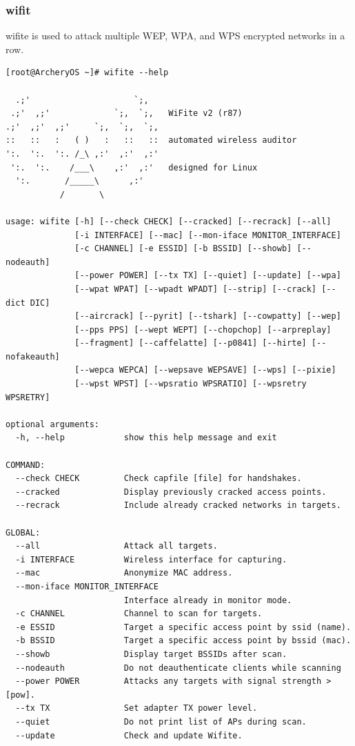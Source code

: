 \documentclass{article}
\begin{document}
\subsubsection{wifit}
wifite is used to attack multiple WEP, WPA, and WPS encrypted networks in a row.
\begin{lstlisting}
[root@ArcheryOS ~]# wifite --help

  .;'                     `;,    
 .;'  ,;'             `;,  `;,   WiFite v2 (r87)
.;'  ,;'  ,;'     `;,  `;,  `;,  
::   ::   :   ( )   :   ::   ::  automated wireless auditor
':.  ':.  ':. /_\ ,:'  ,:'  ,:'  
 ':.  ':.    /___\    ,:'  ,:'   designed for Linux
  ':.       /_____\      ,:'     
           /       \             

usage: wifite [-h] [--check CHECK] [--cracked] [--recrack] [--all]
              [-i INTERFACE] [--mac] [--mon-iface MONITOR_INTERFACE]
              [-c CHANNEL] [-e ESSID] [-b BSSID] [--showb] [--nodeauth]
              [--power POWER] [--tx TX] [--quiet] [--update] [--wpa]
              [--wpat WPAT] [--wpadt WPADT] [--strip] [--crack] [--dict DIC]
              [--aircrack] [--pyrit] [--tshark] [--cowpatty] [--wep]
              [--pps PPS] [--wept WEPT] [--chopchop] [--arpreplay]
              [--fragment] [--caffelatte] [--p0841] [--hirte] [--nofakeauth]
              [--wepca WEPCA] [--wepsave WEPSAVE] [--wps] [--pixie]
              [--wpst WPST] [--wpsratio WPSRATIO] [--wpsretry WPSRETRY]

optional arguments:
  -h, --help            show this help message and exit

COMMAND:
  --check CHECK         Check capfile [file] for handshakes.
  --cracked             Display previously cracked access points.
  --recrack             Include already cracked networks in targets.

GLOBAL:
  --all                 Attack all targets.
  -i INTERFACE          Wireless interface for capturing.
  --mac                 Anonymize MAC address.
  --mon-iface MONITOR_INTERFACE
                        Interface already in monitor mode.
  -c CHANNEL            Channel to scan for targets.
  -e ESSID              Target a specific access point by ssid (name).
  -b BSSID              Target a specific access point by bssid (mac).
  --showb               Display target BSSIDs after scan.
  --nodeauth            Do not deauthenticate clients while scanning
  --power POWER         Attacks any targets with signal strength > [pow].
  --tx TX               Set adapter TX power level.
  --quiet               Do not print list of APs during scan.
  --update              Check and update Wifite.


\end{lstlisting}
\end{document}

